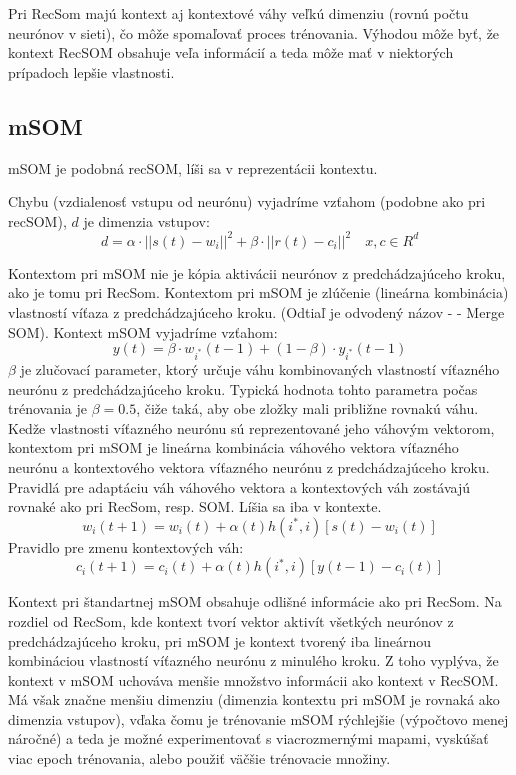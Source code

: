 Pri RecSom majú kontext aj kontextové váhy veľkú dimenziu (rovnú počtu neurónov v sieti), čo môže spomaľovať
proces trénovania.
Výhodou môže byť, že kontext RecSOM obsahuje veľa informácií a teda môže mať v niektorých prípadoch
lepšie vlastnosti. 


\subsection{mSOM}
mSOM je podobná recSOM, líši sa v reprezentácii kontextu. \cite{DBLP:journals/ijon/StrickertH05}

Chybu (vzdialenosť vstupu od neurónu) vyjadríme vzťahom (podobne ako pri recSOM), 
$d$ je dimenzia vstupov:
\begin{equation}
	d = \alpha \cdot ||s(t) - w_i||^{2} + \beta \cdot ||r(t) - c_i||^{2} \quad x, c \in R^{d}
\end{equation}

Kontextom pri mSOM nie je kópia aktivácii neurónov z predchádzajúceho kroku, ako je tomu pri RecSom. 
Kontextom pri mSOM je zlúčenie (lineárna kombinácia) vlastností víťaza z predchádzajúceho kroku.
(Odtiaľ je odvodený názov -  - Merge SOM). 
Kontext mSOM vyjadríme vzťahom:
\begin{equation}
	y(t) = \beta \cdot w_{i^{*}}(t-1) + (1 - \beta) \cdot y_{i^{*}}(t-1)
\end{equation}
$\beta$ je zlučovací parameter, ktorý určuje váhu kombinovaných vlastností
víťazného neurónu z predchádzajúceho kroku. Typická hodnota tohto parametra
počas trénovania je $\beta = 0.5$, čiže taká, aby obe zložky mali približne 
rovnakú váhu. 
Kedže vlastnosti víťazného neurónu sú reprezentované jeho váhovým vektorom, 
kontextom pri mSOM je lineárna kombinácia váhového vektora víťazného neurónu a 
kontextového vektora víťazného neurónu z predchádzajúceho kroku.
Pravidlá pre adaptáciu váh váhového vektora a kontextových váh zostávajú rovnaké ako pri RecSom, resp. SOM. Líšia sa iba v kontexte.
\begin{equation}
	w_i(t + 1) = w_i(t) + \alpha(t)h(i^*, i)[s(t) - w_i(t)]
\end{equation}
Pravidlo pre zmenu kontextových váh:
\begin{equation}
	c_i(t + 1) = c_i(t) + \alpha(t)h(i^*, i)[y(t - 1) - c_i(t)]
\end{equation}

Kontext pri štandartnej mSOM obsahuje odlišné informácie ako pri RecSom.
Na rozdiel od RecSom, kde kontext tvorí vektor aktivít všetkých neurónov z predchádzajúceho kroku, pri
mSOM je kontext tvorený iba lineárnou kombináciou vlastností víťazného neurónu z minulého kroku. Z toho vyplýva, že
kontext v mSOM uchováva menšie množstvo informácii ako kontext v RecSOM.
Má však značne menšiu dimenziu (dimenzia kontextu pri mSOM je rovnaká ako dimenzia vstupov),
vďaka čomu je trénovanie mSOM rýchlejšie (výpočtovo menej náročné) a teda je možné experimentovať 
s viacrozmernými mapami, vyskúšať viac epoch trénovania, alebo použiť väčšie trénovacie množiny.

